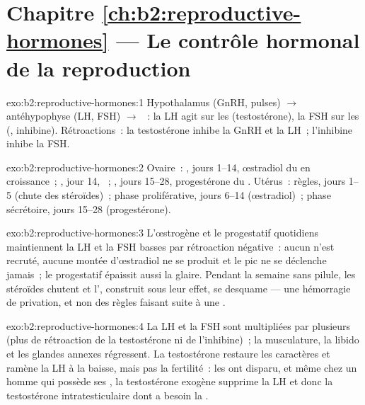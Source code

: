 \section*{Chapitre \ref{ch:b2:reproductive-hormones} --- Le contrôle hormonal de la reproduction}

\begin{solution}{exo:b2:reproductive-hormones:1}
Hypothalamus (GnRH, pulses) $\to$ antéhypophyse (LH, FSH) $\to$
~: la LH agit sur les  (testostérone), la FSH
sur les  (, inhibine). Rétroactions~:
la testostérone inhibe la GnRH et la LH~; l'inhibine inhibe la FSH.
\end{solution}

\begin{solution}{exo:b2:reproductive-hormones:2}
Ovaire~: , jours 1--14, œstradiol du  en
croissance~; , jour 14, ~; , jours
15--28, progestérone du . Utérus~: règles, jours 1--5
(chute des stéroïdes)~; phase proliférative, jours 6--14 (œstradiol)~;
phase sécrétoire, jours 15--28 (progestérone).
\end{solution}

\begin{solution}{exo:b2:reproductive-hormones:3}
L'œstrogène et le progestatif quotidiens maintiennent la LH et la FSH
basses par rétroaction négative~: aucun  n'est recruté, aucune
montée d'œstradiol ne se produit et le pic ne se déclenche jamais~; le
progestatif épaissit aussi la glaire. Pendant la semaine sans pilule,
les stéroïdes chutent et l', construit sous leur effet, se
desquame --- une hémorragie de privation, et non des règles faisant
suite à une .
\end{solution}

\begin{solution}{exo:b2:reproductive-hormones:4}
La LH et la FSH sont multipliées par plusieurs (plus de rétroaction de
la testostérone ni de l'inhibine)~; la musculature, la libido et les
glandes annexes régressent. La testostérone restaure les caractères et
ramène la LH à la baisse, mais pas la fertilité~: les  ont
disparu, et même chez un homme qui possède ses , la
testostérone exogène supprime la LH et donc la testostérone
intratesticulaire dont a besoin la .
\end{solution}

